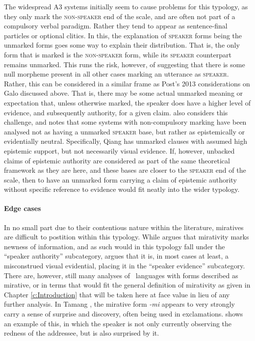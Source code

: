 The widespread A3 systems initially seem to cause problems for this typology, as they only mark the \textsc{non-speaker} end of the scale, and are often not part of a compulsory verbal paradigm. Rather they tend to appear as sentence-final particles or optional clitics. In this, the explanation of \textsc{speaker} forms being the unmarked forms goes some way to explain their distribution. That is, the only form that is marked is the \textsc{non-speaker} form, while its \textsc{speaker} counterpart remains unmarked. This runs the risk, however, of suggesting that there is some null morpheme present in all other cases marking an utterance as \textsc{speaker}. Rather, this can be considered in a similar frame as Post's 2013 considerations on Galo discussed above. That is, there may be some actual unmarked meaning or expectation that, unless otherwise marked, the speaker does have a higher level of evidence, and subsequently authority, for a given claim.  also considers this challenge, and notes that some systems with non-compulsory marking have been analysed not as having a unmarked \textsc{speaker} base, but rather as epistemically or evidentially neutral. Specifically, Qiang \cite[Qiangic: PRC][197]{LaPolla2003} has unmarked clauses with assumed high epistemic support, but not necessarily visual evidence. If, however, unbacked claims of epistemic authority are considered as part of the same theoretical framework as they are here, and these bases are closer to the \textsc{speaker} end of the scale, then to have an unmarked form carrying a claim of epistemic authority without specific reference to evidence would fit neatly into the wider typology.

\paragraph{Edge cases}
In no small part due to their contentious nature within the literature, miratives are difficult to postition within this typology. While  argues that mirativity marks newness of information, and as such would in this typology fall under the ``speaker authority'' subcategory,  argues that it is, in most cases at least, a misconstrued visual evidential, placing it in the ``speaker evidence'' subcategory. There are, however, still many analyses of \lfam\ languages with forms described as mirative, or in terms that would fit the general definition of mirativity as given in Chapter \ref{c:Introduction} that will be taken here at face value in lieu of any further analysis. In Tamang \cite[Tamangic: Nepal,][]{OwenSmith2014}, the mirative form \textit{-mi} appears to very strongly carry a sense of surprise and discovery, often being used in exclamations.  shows an example of this, in which the speaker is not only currently observing the redness of the addressee, but is also surprised by it.

